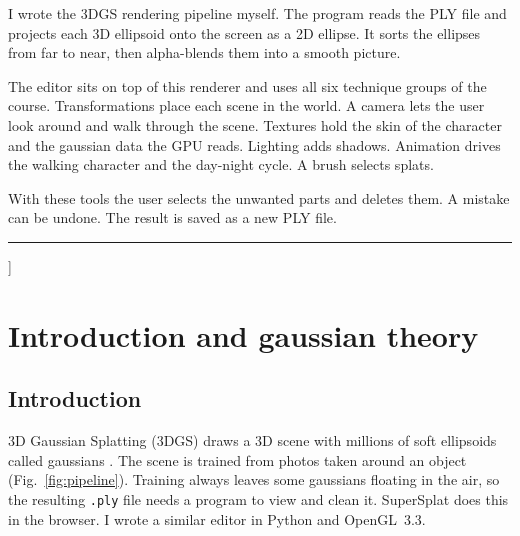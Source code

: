 \documentclass[9pt,twocolumn,a4paper]{extarticle}
\newcommand{\code}[1]{\texttt{#1}}
\begin{document}
{\begin{@twocolumnfalse}
\begin{minipage}[t]{0.715\textwidth}
{I wrote the 3DGS rendering pipeline myself. The program reads the PLY file and projects each 3D ellipsoid onto the screen as a 2D ellipse. It sorts the ellipses from far to near, then alpha-blends them into a smooth picture.

The editor sits on top of this renderer and uses all six technique groups of the course. Transformations place each scene in the world. A camera lets the user look around and walk through the scene. Textures hold the skin of the character and the gaussian data the GPU reads. Lighting adds shadows. Animation drives the walking character and the day-night cycle. A brush selects splats.

With these tools the user selects the unwanted parts and deletes them. A mistake can be undone. The result is saved as a new PLY file.\par}
\end{minipage}

\vspace{0.25cm}
\noindent\rule{\textwidth}{0.4pt}
\vspace{0.35cm}
\end{@twocolumnfalse}
}]

\section{Introduction and gaussian theory}
\label{chap:theory}

\subsection{Introduction}
3D Gaussian Splatting (3DGS) draws a 3D scene with millions of soft ellipsoids called gaussians \cite{kerbl2023gaussian}. The scene is trained from photos taken around an object (Fig.~\ref{fig:pipeline}). Training always leaves some gaussians floating in the air, so the resulting \code{.ply} file needs a program to view and clean it. SuperSplat \cite{supersplat} does this in the browser. I wrote a similar editor in Python and OpenGL~3.3.
\end{document}
